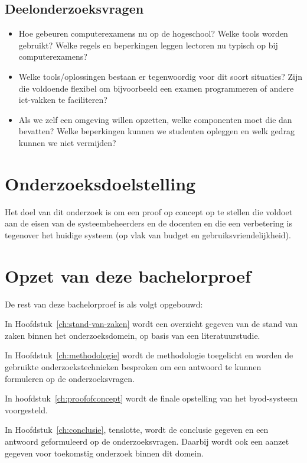 \subsection{Deelonderzoeksvragen}
\begin{itemize}
	 \item Hoe gebeuren computerexamens nu op de hogeschool? Welke tools worden gebruikt? Welke regels en beperkingen leggen lectoren nu typisch op bij computerexamens?
	
	\item Welke tools/oplossingen bestaan er tegenwoordig voor dit soort situaties? Zijn die voldoende flexibel om bijvoorbeeld een examen programmeren of andere ict-vakken te faciliteren?
	
	\item Als we zelf een omgeving willen opzetten, welke componenten moet die dan bevatten? Welke beperkingen kunnen we studenten opleggen en welk gedrag kunnen we niet vermijden?

\end{itemize} 

\section{Onderzoeksdoelstelling}
\label{sec:onderzoeksdoelstelling}

Het doel van dit onderzoek is om een proof op concept op te stellen die voldoet aan de eisen van de systeembeheerders en de docenten en die een verbetering is tegenover het huidige systeem (op vlak van budget en gebruiksvriendelijkheid). 

\section{Opzet van deze bachelorproef}
\label{sec:opzet-bachelorproef}


De rest van deze bachelorproef is als volgt opgebouwd:

In Hoofdstuk~\ref{ch:stand-van-zaken} wordt een overzicht gegeven van de stand van zaken binnen het onderzoeksdomein, op basis van een literatuurstudie.

In Hoofdstuk~\ref{ch:methodologie} wordt de methodologie toegelicht en worden de gebruikte onderzoekstechnieken besproken om een antwoord te kunnen formuleren op de onderzoeksvragen.


In hoofdstuk~\ref{ch:proofofconcept} wordt de finale opstelling van het byod-systeem voorgesteld.  

In Hoofdstuk~\ref{ch:conclusie}, tenslotte, wordt de conclusie gegeven en een antwoord geformuleerd op de onderzoeksvragen. Daarbij wordt ook een aanzet gegeven voor toekomstig onderzoek binnen dit domein.

